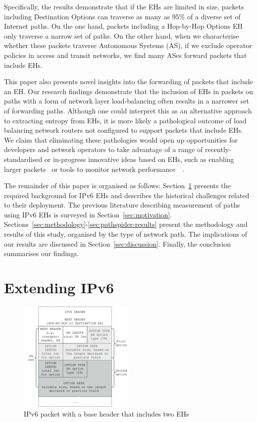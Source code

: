\documentclass[conference]{IEEEtran}
\begin{document}
Specifically, the results demonstrate that if the EHs are limited in size,
packets including Destination Options can traverse as many as
95\% of a diverse set of Internet paths.  On the one hand, packets including a Hop-by-Hop Options EH only traverse a narrow set of paths. On the other hand, when we
characterise whether these packets traverse Autonomous Systems (AS), if we exclude operator policies in access and transit networks, we find many ASes forward packets that include EHs.

This paper also presents novel insights into the forwarding of packets that include an EH. Our research findings
demonstrate that the inclusion of EHs in packets on paths with a form of network layer load-balancing often results in a narrower set of forwarding paths. Although one could interpret this as an alternative approach to extracting entropy from EHs, it is more likely a
pathological outcome of load balancing network routers not configured to support packets that include EHs.
We claim that eliminating these pathologies would open up opportunities for
developers and network operators to take advantage of a range of recently-standardised or in-progress innovative ideas based on EHs, such as enabling larger packets~\cite{rfc9268} or tools to monitor network performance~\cite{rfc8250}~\cite{ietf-ippm-ioam-ipv6-options-10}.


The remainder of this paper is organised as follows:  Section~\ref{sec:background} presents
the required background for IPv6 EHs and describes the historical challenges related to
their deployment.  The previous literature describing measurement of paths using IPv6
EHs is surveyed in Section~\ref{sec:motivation}.
Sections~\ref{sec:methodology}-\ref{sec:pathspider-results} present the
methodology and results of this study, organised by the type of network path.  The
implications of our results are discussed in Section~\ref{sec:discussion}.
Finally, the conclusion summarises our findings.

\section{Extending IPv6}
\label{sec:background}

\label{sec:ipv6-option-deployment}

\begin{figure}
\centering
  \includegraphics[width=0.5\textwidth]{ehformat.png}
  \caption{IPv6 packet with a base header that includes two EHs}
  \label{fig:eh-format}
\end{figure}
\end{document}
